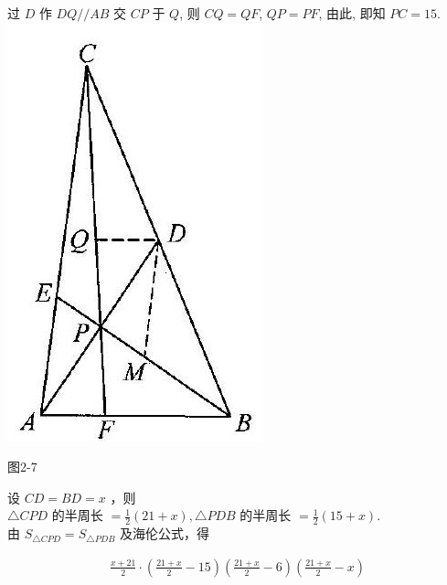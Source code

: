 \documentclass[10pt]{article}
\begin{document}
过 $D$ 作 $D Q / / A B$ 交 $C P$ 于 $Q$, 则 $C Q=Q F$, $Q P=P F$, 由此, 即知 $P C=15$.\\
\includegraphics[max width=\textwidth, center]{2024_10_30_2c8f45efd4a519b08e1ag-019}

图2-7

设 $C D=B D=x$ ，则\\
$\triangle C P D$ 的半周长 $=\frac{1}{2}(21+x), \triangle P D B$ 的半周长 $=\frac{1}{2}(15+x)$.\\
由 $S_{\triangle C P D}=S_{\triangle P D B}$ 及海伦公式，得

\begin{align*}
\frac{x+21}{2} \cdot\left(\frac{21+x}{2}-15\right)\left(\frac{21+x}{2}-6\right)\left(\frac{21+x}{2}-x\right)
\end{align*}
\end{document}
